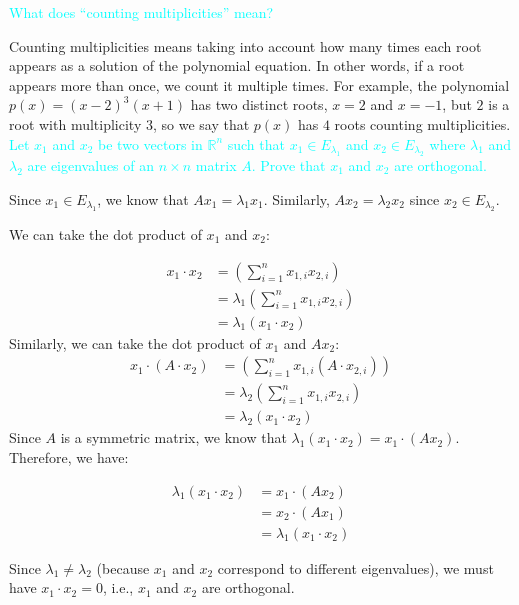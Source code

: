 \documentclass[fontsize=12pt]{scrartcl}
\begin{document}
\noindent
\textcolor{cyan}{What does ``counting multiplicities'' mean?}

\noindent
Counting multiplicities means taking into account how many times each root appears as a solution of the polynomial equation. In other words, if a root appears more than once, we count it multiple times. For example, the polynomial $p(x) = (x-2)^3(x+1)$ has two distinct roots, $x=2$ and $x=-1$, but $2$ is a root with multiplicity $3$, so we say that $p(x)$ has $4$ roots counting multiplicities.
\\

\noindent
\textcolor{cyan}{Let $x_1$ and $x_2$ be two vectors in $\mathbb{R}^n$ such that $x_1 \in E_{\lambda_1}$ and $x_2 \in E_{\lambda_2}$ where $\lambda_1$ and $\lambda_2$ are eigenvalues of an $n \times n$ matrix $A$. Prove that $x_1$ and $x_2$ are orthogonal.}

\noindent
Since $x_1 \in E_{\lambda_1}$, we know that $Ax_1 = \lambda_1 x_1$. Similarly, $Ax_2 = \lambda_2 x_2$ since $x_2 \in E_{\lambda_2}$.

\noindent
We can take the dot product of $x_1$ and $x_2$:

\begin{align*}
	x_1\cdot x_2 &= (\sum_{i = 1}^nx_{1, i}x_{2, i}) \\
	&= \lambda_1(\sum_{i = 1}^nx_{1, i}x_{2, i}) \\
	&= \lambda_1(x_1\cdot x_2)
\end{align*}
\noindent
Similarly, we can take the dot product of $x_1$ and $Ax_2$:
\begin{align*}
	x_1\cdot (A\cdot x_2) &= (\sum_{i = 1}^nx_{1, i}(A\cdot x_{2, i})) \\
	&= \lambda_2(\sum_{i = 1}^nx_{1, i}x_{2, i}) \\
	&= \lambda_2(x_1\cdot x_2)
\end{align*}
\noindent
Since $A$ is a symmetric matrix, we know that $\lambda_1(x_1 \cdot x_2) = x_1 \cdot (Ax_2)$. Therefore, we have:

\begin{align*}
	\lambda_1(x_1 \cdot x_2) &= x_1\cdot (Ax_2) \\
	&= x_2\cdot (Ax_1) \\
	&= \lambda_1(x_1 \cdot x_2)
\end{align*}

\noindent
Since $\lambda_1 \neq \lambda_2$ (because $x_1$ and $x_2$ correspond to different eigenvalues), we must have $x_1 \cdot x_2 = 0$, i.e., $x_1$ and $x_2$ are orthogonal.
\end{document}
